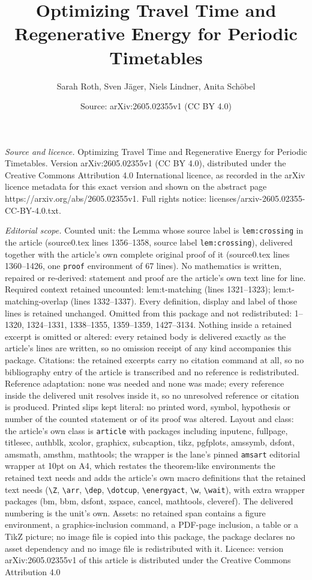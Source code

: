 \documentclass[10pt,a4paper]{amsart}
\title[Optimizing Travel Time and Regenerative Energy for Periodic ]{Optimizing Travel Time and Regenerative Energy for Periodic Timetables}
\author{Sarah Roth, Sven J\"ager, Niels Lindner, Anita Sch\"obel}
\date{Source: arXiv:2605.02355v1 (CC BY 4.0)}
\begin{document}
\maketitle

\noindent\emph{Source and licence.} Optimizing Travel Time and Regenerative Energy for Periodic Timetables. Version arXiv:2605.02355v1 (CC BY 4.0), distributed under the Creative Commons Attribution 4.0 International licence, as recorded in the arXiv licence metadata for this exact version and shown on the abstract page https://arxiv.org/abs/2605.02355v1. Full rights notice: licenses/arxiv-2605.02355-CC-BY-4.0.txt.\par\smallskip

\noindent\textit{Editorial scope.} Counted unit: the Lemma whose source label is \texttt{lem:crossing} in the article (source0.tex lines 1356--1358, source label \texttt{lem:crossing}), delivered together with the article's own complete original proof of it (source0.tex lines 1360--1426, one \texttt{proof} environment of 67 lines). No mathematics is written, repaired or re-derived: statement and proof are the article's own text line for line. Required context retained uncounted: lem:t-matching (lines 1321--1323); lem:t-matching-overlap (lines 1332--1337). Every definition, display and label of those lines is retained unchanged. Omitted from this package and not redistributed: 1--1320, 1324--1331, 1338--1355, 1359--1359, 1427--3134. Nothing inside a retained excerpt is omitted or altered: every retained body is delivered exactly as the article's lines are written, so no omission receipt of any kind accompanies this package. Citations: the retained excerpts carry no citation command at all, so no bibliography entry of the article is transcribed and no reference is redistributed. Reference adaptation: none was needed and none was made; every reference inside the delivered unit resolves inside it, so no unresolved reference or citation is produced. Printed slips kept literal: no printed word, symbol, hypothesis or number of the counted statement or of its proof was altered. Layout and class: the article's own class is \texttt{article} with packages including inputenc, fullpage, titlesec, authblk, xcolor, graphicx, subcaption, tikz, pgfplots, amssymb, dsfont, amsmath, amsthm, mathtools; the wrapper is the lane's pinned \texttt{amsart} editorial wrapper at 10pt on A4, which restates the theorem-like environments the retained text needs and adds the article's own macro definitions that the retained text needs (\texttt{\textbackslash Z}, \texttt{\textbackslash arr}, \texttt{\textbackslash dep}, \texttt{\textbackslash dotcup}, \texttt{\textbackslash energyact}, \texttt{\textbackslash w}, \texttt{\textbackslash wait}), with extra wrapper packages (bm, bbm, dsfont, xspace, cancel, mathtools, cleveref). The delivered numbering is the unit's own. Assets: no retained span contains a figure environment, a graphics-inclusion command, a PDF-page inclusion, a table or a TikZ picture; no image file is copied into this package, the package declares no asset dependency and no image file is redistributed with it. Licence: version arXiv:2605.02355v1 of this article is distributed under the Creative Commons Attribution 4.0 
\end{document}
